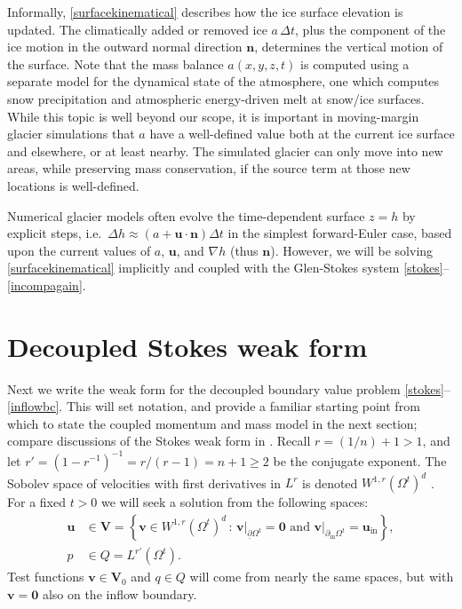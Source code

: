 \documentclass[letterpaper,final,12pt,reqno]{amsart}
\newcommand{\grad}{\nabla}
\newcommand{\bn}{\mathbf{n}}
\newcommand{\bu}{\mathbf{u}}
\newcommand{\bv}{\mathbf{v}}
\newcommand{\bV}{\mathbf{V}}
\newcommand{\bzero}{\bm{0}}
\begin{document}
Informally, \eqref{surfacekinematical} describes how the ice surface elevation is updated.  The climatically added or removed ice $a\,\Delta t$, plus the component of the ice motion in the outward normal direction $\bn$, determines the vertical motion of the surface.  Note that the mass balance $a(x,y,z,t)$ is computed using a separate model for the dynamical state of the atmosphere, one which computes snow precipitation and atmospheric energy-driven melt at snow/ice surfaces.  While this topic is well beyond our scope, it is important in moving-margin glacier simulations that $a$ have a well-defined value both at the current ice surface and elsewhere, or at least nearby.  The simulated glacier can only move into new areas, while preserving mass conservation, if the source term at those new locations is well-defined.

Numerical glacier models often evolve the time-dependent surface $z=h$ by explicit steps, i.e.~$\Delta h \approx \left(a + \bu\cdot \bn\right) \Delta t$ in the simplest forward-Euler case, based upon the current values of $a$, $\bu$, and $\grad h$ (thus $\bn$).  However, we will be solving \eqref{surfacekinematical} implicitly and coupled with the Glen-Stokes system \eqref{stokes}--\eqref{incompagain}.


\section{Decoupled Stokes weak form} \label{sec:weakstokes}

Next we write the weak form for the decoupled boundary value problem \eqref{stokes}--\eqref{inflowbc}.  This will set notation, and provide a familiar starting point from which to state the coupled momentum and mass model in the next section; compare discussions of the Stokes weak form in  \cite{Bueler2021,Elmanetal2014,JouvetRappaz2011}.  Recall $r=(1/n) + 1>1$, and let $r'=(1-r^{-1})^{-1}=r/(r-1)=n+1\ge 2$ be the conjugate exponent.  The Sobolev space of velocities with first derivatives in $L^r$ is denoted $W^{1,r}(\Omega^t)^d$ \cite{Evans2010}.  For a fixed $t>0$ we will seek a solution from the following spaces:
\begin{align*}
\bu &\in \bV = \left\{\bv \in W^{1,r}(\Omega^t)^d\,:\,\bv\big|_{\underline{\partial} \Omega^t}=\bzero \text{ and } \bv\big|_{\partial_{\text{in}} \Omega^t} = \bu_{\text{in}}\right\}, \\
p &\in Q = L^{r'}(\Omega^t).
\end{align*}
Test functions $\bv \in \bV_0$ and $q\in Q$ will come from nearly the same spaces, but with $\bv=\bzero$ also on the inflow boundary.
\end{document}

